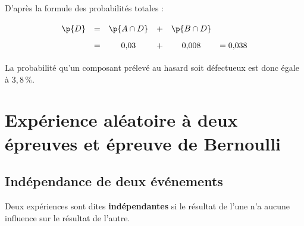 \begin{methode}
\begin{itemize}
		      D'après la formule des probabilités totales :
		      \[
			      \def\arraystretch{1.7}
			      \begin{array}{rccccl}
				      \p{D} & = & \p{A \cap D} & + & \p{B \cap D} &           \\
				            & = & 0{,}03       & + & 0{,}008      & = 0{,}038
			      \end{array}
		      \]

		      La probabilité qu'un composant prélevé au hasard soit défectueux est donc égale à $3{,}8\,\%$.
	\end{itemize}
\end{methode}

\section{Expérience aléatoire à deux épreuves et épreuve de Bernoulli}

\subsection{Indépendance de deux événements}

\begin{defin}
	Deux expériences sont dites \textbf{indépendantes} si le résultat de l'une n'a aucune influence sur le résultat de l'autre.
\end{defin}

